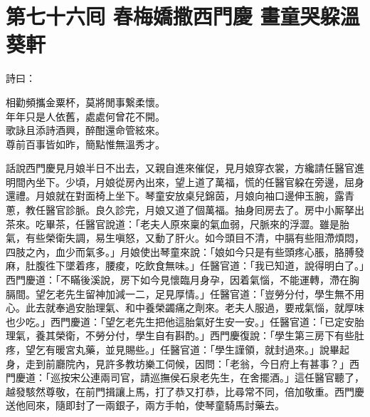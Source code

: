 
\chapter*{第七十六囘 春梅嬌撒西門慶 畫童哭躱溫葵軒}


詩曰：

\begin{myquote} 
相勸頻攜金粟杯，莫將閒事繋柔懷。\\年年只是人依舊，處處何曾花不開。\\歌詠且添詩酒興，醉酣還命管絃來。\\尊前百事皆如昨，簡點惟無溫秀才。
\end{myquote} 

話說西門慶見月娘半日不出去，又親自進來催促，見月娘穿衣裳，方纔請任醫官進明間內坐下。{}少頃，月娘從房內出來，望上道了萬福，慌的任醫官躱在旁邊，屈身還禮。月娘就在對面椅上坐下。琴童安放桌兒錦茵，月娘向袖口邊伸玉腕，露青蔥，教任醫官診脈。良久診完，月娘又道了個萬福。抽身囘房去了。房中小厮拏出茶來。吃畢茶，任醫官說道：「老夫人原來稟的氣血弱，尺脈來的浮澀。雖是胎氣，有些榮衛失調，易生嗔怒，又動了肝火。如今頭目不清，中膈有些阻滯煩悶，四肢之內，血少而氣多。」{}月娘使出琴童來說：「娘如今只是有些頭疼心脹，胳膊發麻，肚腹徃下墜着疼，腰痠，吃飲食無味。」任醫官道：「我已知道，說得明白了。」西門慶道：「不瞞後溪說，房下如今見懷臨月身孕，因着氣惱，不能運轉，滯在胸膈間。望乞老先生留神加減一二，足見厚情。」{}任醫官道：「豈勞分付，學生無不用心。此去就奉過安胎理氣、和中養榮蠲痛之劑來。老夫人服過，要戒氣惱，{}就厚味也少吃。」西門慶道：「望乞老先生把他這胎氣好生安一安。」任醫官道：「已定安胎理氣，養其榮衛，不勞分付，學生自有斟酌。」西門慶復說：「學生第三房下有些肚疼，望乞有暖宮丸藥，並見賜些。」任醫官道：「學生謹領，就封過來。」說畢起身，走到前廳院內，見許多教坊樂工伺候，因問：「老翁，今日府上有甚事？」西門慶道：「巡按宋公連兩司官，請巡撫侯石泉老先生，在舍擺酒。」這任醫官聽了，越發駭然尊敬，在前門揖讓上馬，打了恭又打恭，比尋常不同，倍加敬重。西門慶送他囘來，隨即封了一兩銀子，兩方手帕，使琴童騎馬討藥去。

